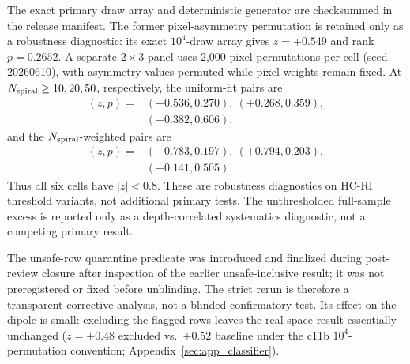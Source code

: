 \documentclass[twocolumn,linenumbers]{aastex702}
\newcommand{\HCRI}{\textsc{HC-RI}}
\begin{document}
The exact primary draw array and deterministic generator are checksummed in the release manifest. The former pixel-asymmetry permutation is retained only as a robustness diagnostic: its exact $10^4$-draw array gives $z=+0.549$ and rank $p=0.2652$. A separate $2\times3$ panel uses 2,000 pixel permutations per cell (seed 20260610), with asymmetry values permuted while pixel weights remain fixed. At $N_{\rm spiral}\geq10,20,50$, respectively, the uniform-fit pairs are
\begin{equation}
\begin{aligned}
(z,p)={}&(+0.536,0.270),\ (+0.268,0.359),\\
        &(-0.382,0.606),
\end{aligned}
\end{equation}
and the $N_{\rm spiral}$-weighted pairs are
\begin{equation}
\begin{aligned}
(z,p)={}&(+0.783,0.197),\ (+0.794,0.203),\\
        &(-0.141,0.505).
\end{aligned}
\end{equation}
Thus all six cells have $|z|<0.8$. These are robustness diagnostics on \HCRI{} threshold variants, not additional primary tests. The unthresholded full-sample excess is reported only as a depth-correlated systematics diagnostic, not a competing primary result.

The unsafe-row quarantine predicate was introduced and finalized during
post-review closure after inspection of the earlier unsafe-inclusive result; it
was not preregistered or fixed before unblinding. The strict rerun is therefore a
transparent corrective analysis, not a blinded confirmatory test. Its effect on
the dipole is small: excluding the flagged rows leaves the real-space result
essentially unchanged ($z=+0.48$ excluded vs.\ $+0.52$ baseline under the c11b
$10^{4}$-permutation convention; Appendix~\ref{sec:app_classifier}).
\end{document}
